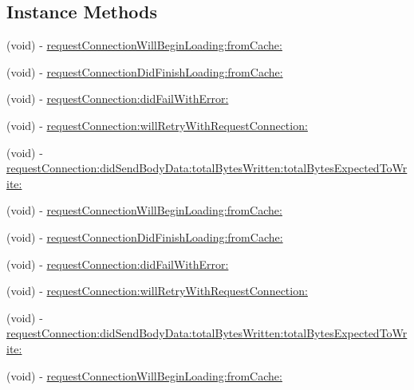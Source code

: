 \subsection*{Instance Methods}
\begin{DoxyCompactItemize}
\item 
(void) -\/ \hyperlink{protocolFBRequestConnectionDelegate_01-p_a8e31e2b5023edb3b869c0cd0be288a29}{request\+Connection\+Will\+Begin\+Loading\+:from\+Cache\+:}
\item 
(void) -\/ \hyperlink{protocolFBRequestConnectionDelegate_01-p_ade2925bfe662c883d45fe849f332991f}{request\+Connection\+Did\+Finish\+Loading\+:from\+Cache\+:}
\item 
(void) -\/ \hyperlink{protocolFBRequestConnectionDelegate_01-p_a2625e8e847596ba8b2baf3a30fe24268}{request\+Connection\+:did\+Fail\+With\+Error\+:}
\item 
(void) -\/ \hyperlink{protocolFBRequestConnectionDelegate_01-p_aa3a69b65c59523a708b4f343730d7966}{request\+Connection\+:will\+Retry\+With\+Request\+Connection\+:}
\item 
(void) -\/ \hyperlink{protocolFBRequestConnectionDelegate_01-p_a84427a6debebcef494f5766d8f70ce16}{request\+Connection\+:did\+Send\+Body\+Data\+:total\+Bytes\+Written\+:total\+Bytes\+Expected\+To\+Write\+:}
\item 
(void) -\/ \hyperlink{protocolFBRequestConnectionDelegate_01-p_a8e31e2b5023edb3b869c0cd0be288a29}{request\+Connection\+Will\+Begin\+Loading\+:from\+Cache\+:}
\item 
(void) -\/ \hyperlink{protocolFBRequestConnectionDelegate_01-p_ade2925bfe662c883d45fe849f332991f}{request\+Connection\+Did\+Finish\+Loading\+:from\+Cache\+:}
\item 
(void) -\/ \hyperlink{protocolFBRequestConnectionDelegate_01-p_a2625e8e847596ba8b2baf3a30fe24268}{request\+Connection\+:did\+Fail\+With\+Error\+:}
\item 
(void) -\/ \hyperlink{protocolFBRequestConnectionDelegate_01-p_aa3a69b65c59523a708b4f343730d7966}{request\+Connection\+:will\+Retry\+With\+Request\+Connection\+:}
\item 
(void) -\/ \hyperlink{protocolFBRequestConnectionDelegate_01-p_a84427a6debebcef494f5766d8f70ce16}{request\+Connection\+:did\+Send\+Body\+Data\+:total\+Bytes\+Written\+:total\+Bytes\+Expected\+To\+Write\+:}
\item 
(void) -\/ \hyperlink{protocolFBRequestConnectionDelegate_01-p_a8e31e2b5023edb3b869c0cd0be288a29}{request\+Connection\+Will\+Begin\+Loading\+:from\+Cache\+:}
\item 

\end{DoxyCompactItemize}
